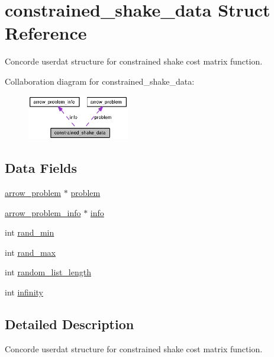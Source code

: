 \hypertarget{structconstrained__shake__data}{
\section{constrained\_\-shake\_\-data Struct Reference}
\label{structconstrained__shake__data}
}
Concorde userdat structure for constrained shake cost matrix function.  


Collaboration diagram for constrained\_\-shake\_\-data:\nopagebreak
\begin{figure}[H]
\begin{center}
\leavevmode
\includegraphics[width=126pt]{structconstrained__shake__data__coll__graph}
\end{center}
\end{figure}
\subsection*{Data Fields}
\begin{CompactItemize}
\item 
\hyperlink{structarrow__problem}{arrow\_\-problem} $\ast$ \hyperlink{structconstrained__shake__data_ae6de8c84cb5dc65aae992effa7c2763}{problem}
\item 
\hyperlink{structarrow__problem__info}{arrow\_\-problem\_\-info} $\ast$ \hyperlink{structconstrained__shake__data_d9b2d3116046f50437d023ac9bfcd51f}{info}
\item 
int \hyperlink{structconstrained__shake__data_76a13ad58e4ad8c74270ce8b05765ff9}{rand\_\-min}
\item 
int \hyperlink{structconstrained__shake__data_39972f2868c566a04f200957d9ad0c3f}{rand\_\-max}
\item 
int \hyperlink{structconstrained__shake__data_0114e4db38ea88cd199781d7ba97a44b}{random\_\-list\_\-length}
\item 
int \hyperlink{structconstrained__shake__data_ba0c33ec57d7f977911088e41b48c606}{infinity}
\end{CompactItemize}


\subsection{Detailed Description}
Concorde userdat structure for constrained shake cost matrix function. 

